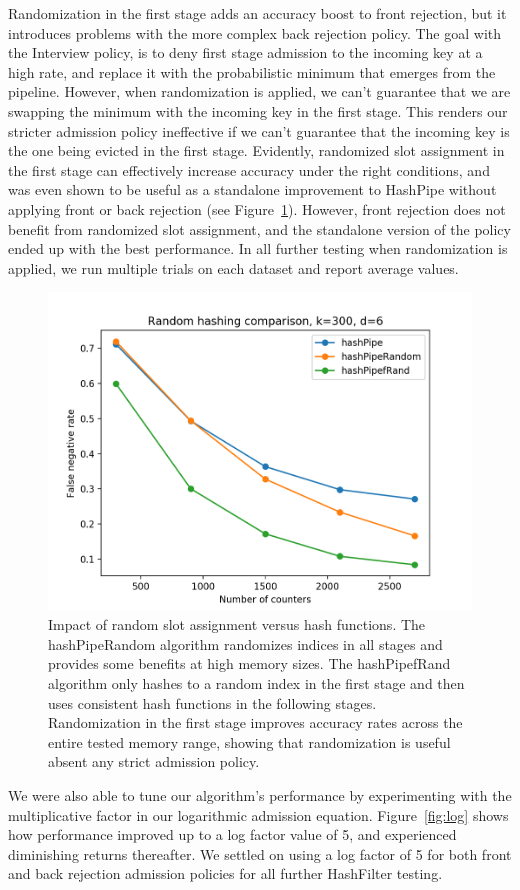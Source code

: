 Randomization in the first stage adds an accuracy boost to front rejection, but it introduces problems with the more complex back rejection policy. The goal with the Interview policy, is to deny first stage admission to the incoming key at a high rate, and replace it with the probabilistic minimum that emerges from the pipeline. However, when randomization is applied, we can't guarantee that we are swapping the minimum with the incoming key in the first stage. This renders our stricter admission policy ineffective if we can't guarantee that the incoming key is the one being evicted in the first stage. Evidently, randomized slot assignment in the first stage can effectively increase accuracy under the right conditions, and was even shown to be useful as a standalone improvement to HashPipe without applying front or back rejection (see Figure~\ref{fig:random}). However, front rejection does not benefit from randomized slot assignment, and the standalone version of the policy ended up with the best performance. In all further testing when randomization is applied, we run multiple trials on each dataset and report average values.
\begin{figure}[!htb]
  \centering
    \includegraphics[scale=0.5]{random}
     \caption{Impact of random slot assignment versus hash functions. The hashPipeRandom algorithm randomizes indices in all stages and provides some benefits at high memory sizes. The hashPipefRand algorithm only hashes to a random index in the first stage and then uses consistent hash functions in the following stages. Randomization in the first stage improves accuracy rates across the entire tested memory range, showing that randomization is useful absent any strict admission policy.}
     \label{fig:random}
\end{figure}
We were also able to tune our algorithm's performance by experimenting with the multiplicative factor in our logarithmic admission equation. Figure~\ref{fig:log} shows how performance improved up to a log factor value of 5, and experienced diminishing returns thereafter. We settled on using a log factor of 5 for both front and back rejection admission policies for all further HashFilter testing.
